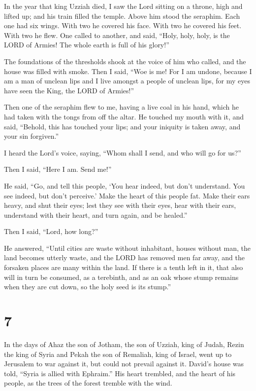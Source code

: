  In the year that king Uzziah died, I saw the Lord sitting
on a throne, high and lifted up; and his train filled the temple.
 Above him stood the seraphim. Each one had six wings. With
two he covered his face. With two he covered his feet. With two he flew.
 One called to another, and said, ``Holy, holy, holy, is the
LORD of Armies! The whole earth is full of his glory!''

 The foundations of the thresholds shook at the voice of him
who called, and the house was filled with smoke.  Then I
said, ``Woe is me! For I am undone, because I am a man of unclean lips
and I live amongst a people of unclean lips, for my eyes have seen the
King, the LORD of Armies!''

 Then one of the seraphim flew to me, having a live coal in
his hand, which he had taken with the tongs from off the altar.
 He touched my mouth with it, and said, ``Behold, this has
touched your lips; and your iniquity is taken away, and your sin
forgiven.''

 I heard the Lord's voice, saying, ``Whom shall I send, and
who will go for us?''

Then I said, ``Here I am. Send me!''

 He said, ``Go, and tell this people, `You hear indeed, but
don't understand. You see indeed, but don't perceive.' 
Make the heart of this people fat. Make their ears heavy, and shut their
eyes; lest they see with their eyes, hear with their ears, understand
with their heart, and turn again, and be healed.''

 Then I said, ``Lord, how long?''

He answered, ``Until cities are waste without inhabitant, houses without
man, the land becomes utterly waste,  and the LORD has
removed men far away, and the forsaken places are many within the land.
 If there is a tenth left in it, that also will in turn be
consumed, as a terebinth, and as an oak whose stump remains when they
are cut down, so the holy seed is its stump.''

\hypertarget{section-6}{%
\section{7}\label{section-6}}

 In the days of Ahaz the son of Jotham, the son of Uzziah,
king of Judah, Rezin the king of Syria and Pekah the son of Remaliah,
king of Israel, went up to Jerusalem to war against it, but could not
prevail against it.  David's house was told, ``Syria is
allied with Ephraim.'' His heart trembled, and the heart of his people,
as the trees of the forest tremble with the wind.

